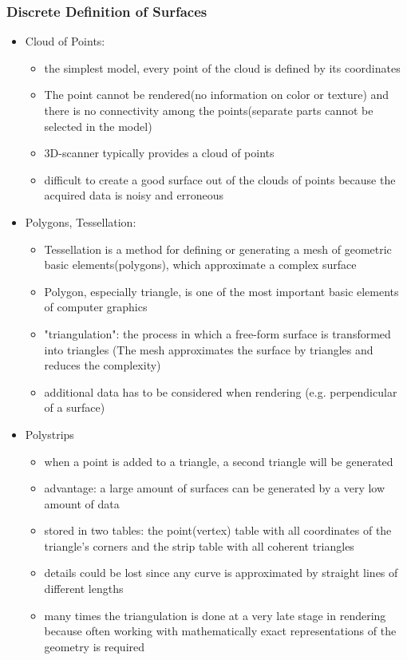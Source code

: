 \documentclass{standalone}
\begin{document}
\subsubsection*{Discrete Definition of Surfaces}
\begin{itemize}
	\item Cloud of Points:
	\begin{itemize}
		\item the simplest model, every point of the cloud is defined by its coordinates
		\item The point cannot be rendered(no information on color or texture) and there is no connectivity among the points(separate parts cannot be selected in the model)
		\item 3D-scanner typically provides a cloud of points
		\item difficult to create a good surface out of the clouds of points because the acquired data is noisy and erroneous
	\end{itemize}
	\item Polygons, Tessellation:
	\begin{itemize}
		\item Tessellation is a method for defining or generating a mesh of geometric basic elements(polygons), which approximate a complex surface
		\item Polygon, especially triangle, is one of the most important basic elements of computer graphics
		\item "triangulation": the process in which a free-form surface is transformed into triangles (The mesh approximates the surface by triangles and reduces the complexity)
		\item additional data has to be considered when rendering (e.g. perpendicular of a surface)
	\end{itemize}
	\item Polystrips
	\begin{itemize}
		\item when a point is added to a triangle, a second triangle will be generated
		\item advantage: a large amount of surfaces can be generated by a very low amount of data
		\item stored in two tables: the point(vertex) table with all coordinates of the triangle's corners and the strip table with all coherent triangles
		\item details could be lost since any curve is approximated by straight lines of different lengths
		\item many times the triangulation is done at a very late stage in rendering because often working with mathematically exact representations of the geometry is required
	\end{itemize}
\end{itemize}
\end{document}
